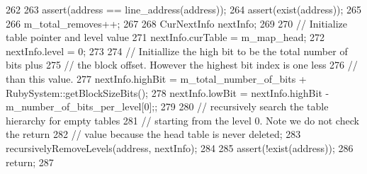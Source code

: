 \begin{DoxyCode}
262 {
263     assert(address == line_address(address));
264     assert(exist(address));
265 
266     m_total_removes++;
267 
268     CurNextInfo nextInfo;
269 
270     // Initialize table pointer and level value
271     nextInfo.curTable = m_map_head;
272     nextInfo.level = 0;
273 
274     // Initiallize the high bit to be the total number of bits plus
275     // the block offset.  However the highest bit index is one less
276     // than this value.
277     nextInfo.highBit = m_total_number_of_bits + RubySystem::getBlockSizeBits();
278     nextInfo.lowBit = nextInfo.highBit - m_number_of_bits_per_level[0];;
279 
280     // recursively search the table hierarchy for empty tables
281     // starting from the level 0.  Note we do not check the return
282     // value because the head table is never deleted;
283     recursivelyRemoveLevels(address, nextInfo);
284 
285     assert(!exist(address));
286     return;
287 }
\end{DoxyCode}


